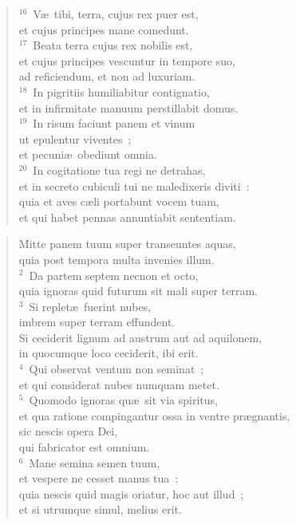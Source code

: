 \begin{flushleft}\begin{verse}${}^{16}$~V\ae\ tibi, terra, cujus rex puer est,\\ et cujus principes mane comedunt.\\
${}^{17}$~Beata terra cujus rex nobilis est,\\ et cujus principes vescuntur in tempore suo,\\ ad reficiendum, et non ad luxuriam.\\
${}^{18}$~In pigritiis humiliabitur contignatio,\\ et in infirmitate manuum perstillabit domus.\\
${}^{19}$~In risum faciunt panem et vinum\\ ut epulentur viventes~;\\ et pecuni\ae\ obediunt omnia.\\
${}^{20}$~In cogitatione tua regi ne detrahas,\\ et in secreto cubiculi tui ne maledixeris diviti~:\\ quia et aves c\ae li portabunt vocem tuam,\\ et qui habet pennas annuntiabit sententiam.\end{verse}\end{flushleft}


\begin{flushleft}\begin{verse}\vspace{-19pt}\hspace{6pt}Mitte panem tuum super transeuntes aquas,\\\hspace{6pt} quia post tempora multa invenies illum.\\
${}^{2}$~Da partem septem necnon et octo,\\ quia ignoras quid futurum sit mali super terram.\\
${}^{3}$~Si replet\ae\ fuerint nubes,\\ imbrem super terram effundent.\\ Si ceciderit lignum ad austrum aut ad aquilonem,\\ in quocumque loco ceciderit, ibi erit.\\
${}^{4}$~Qui observat ventum non seminat~;\\ et qui considerat nubes numquam metet.\\
${}^{5}$~Quomodo ignoras qu\ae\ sit via spiritus,\\ et qua ratione compingantur ossa in ventre pr\ae gnantis,\\ sic nescis opera Dei,\\ qui fabricator est omnium.\\
${}^{6}$~Mane semina semen tuum,\\ et vespere ne cesset manus tua~:\\ quia nescis quid magis oriatur, hoc aut illud~;\\ et si utrumque simul, melius erit.\end{verse}\end{flushleft}


